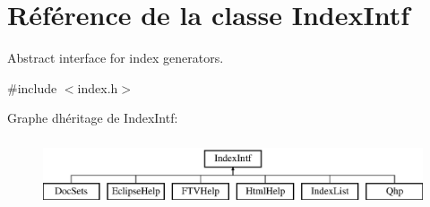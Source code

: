 \hypertarget{class_index_intf}{}\section{Référence de la classe Index\+Intf}
\label{class_index_intf}


Abstract interface for index generators.  




{\ttfamily \#include $<$index.\+h$>$}

Graphe d\textquotesingle{}héritage de Index\+Intf\+:\begin{figure}[H]
\begin{center}
\leavevmode
\includegraphics[height=2.000000cm]{class_index_intf}
\end{center}
\end{figure}
